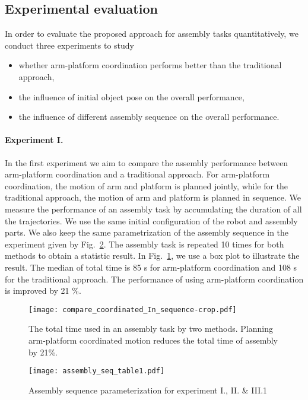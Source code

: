\subsection{Experimental evaluation}
In order to  evaluate the proposed approach for assembly tasks quantitatively, we conduct three experiments to study 
\begin{itemize}
\item whether arm-platform coordination performs better than the traditional approach,
\item the influence of initial object pose on the overall performance,  
\item the influence of different assembly sequence on the overall performance.
\end{itemize}

\paragraph{Experiment I.} In the first experiment we  aim to compare the assembly performance between arm-platform coordination and a traditional approach. For arm-platform coordination, the motion of arm and platform is planned jointly, while for the traditional approach, the motion of arm and platform is planned in sequence. We measure the performance of an assembly task by accumulating the duration of all the trajectories. We use the same initial configuration of the robot and assembly parts. We also keep the same parametrization of the assembly sequence in the experiment given by Fig.~\ref{fig:assembly_sequence_exp1}. The assembly task is repeated 10 times for both methods to obtain a statistic result. In Fig.~\ref{fig:compare_coordinated_vs_in_sequence}, we use a box plot to illustrate the result. The median of total time is 85 s for arm-platform coordination and 108 s for the traditional approach. The performance of using arm-platform coordination is improved by 21 \%. 

\begin{figure}[!htbp]
\centering
\texttt{[image: compare\_coordinated\_In\_sequence-crop.pdf]}
\captionsetup{justification=raggedright}
\caption{The total time used in an assembly task by two methods. Planning arm-platform coordinated motion reduces the total time of assembly by 21\%.}
\label{fig:compare_coordinated_vs_in_sequence}       %
\end{figure} 
\begin{figure}[!htbp]
\centering
\texttt{[image: assembly\_seq\_table1.pdf]}
\captionsetup{justification=raggedright}
\caption{Assembly sequence parameterization for experiment I., II. \& III.1}
\label{fig:assembly_sequence_exp1}       %
\end{figure} 

